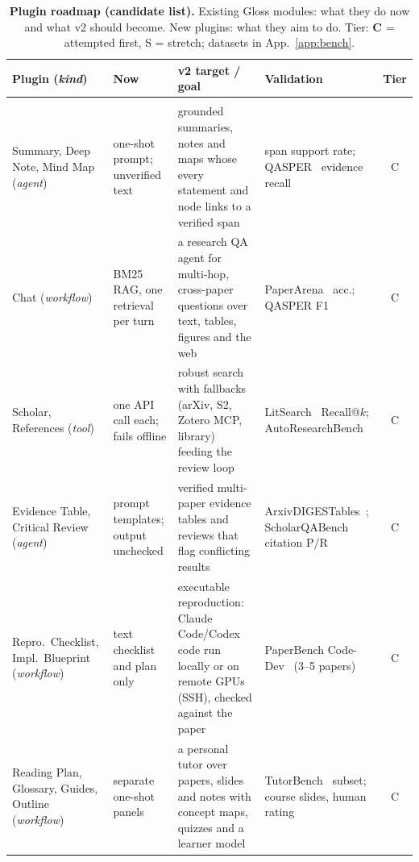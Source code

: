 \documentclass{article}
\newcommand{\rowrule}{\arrayrulecolor{glgray!45}\specialrule{0.25pt}{0.6pt}{0.9pt}\arrayrulecolor{black}}
\newcommand{\gloss}{Gloss}
\begin{document}
\begin{table}[!t]
  \caption{\textbf{Plugin roadmap (candidate list).} Existing \gloss{} modules: what they do now and what v2 should become. New plugins: what they aim to do. Tier: \textbf{C} = attempted first, S = stretch; datasets in App.~\ref{app:bench}.}
  \label{tab:plugins}
  \centering
  \scriptsize
  \setlength{\tabcolsep}{2.6pt}
  \renewcommand{\arraystretch}{1.05}
  \begin{tabularx}{\textwidth}{@{}>{\raggedright\arraybackslash}p{2.45cm}>{\raggedright\arraybackslash}p{1.95cm}>{\raggedright\arraybackslash}X>{\raggedright\arraybackslash}p{3.45cm}c@{}}
    \toprule
    \textbf{Plugin} (\textit{kind}) & \textbf{Now} & \textbf{v2 target / goal} & \textbf{Validation} & \textbf{Tier} \\
    \midrule
    \rowcolor{glpurple!7}\multicolumn{5}{@{}l}{\textit{Existing modules: what they do now $\to$ what v2 should become}} \\
    \rowrule
    Summary, Deep Note, Mind Map (\textit{agent}) & one-shot prompt; unverified text & grounded summaries, notes and maps whose every statement and node links to a verified span & span support rate; QASPER~\cite{dasigi2021qasper} evidence recall & C \\
    \rowrule
    Chat (\textit{workflow}) & BM25 RAG, one retrieval per turn & a research QA agent for multi-hop, cross-paper questions over text, tables, figures and the web & PaperArena~\cite{wang2025paperarena} acc.; QASPER F1 & C \\
    \rowrule
    Scholar, References (\textit{tool}) & one API call each; fails offline & robust search with fallbacks (arXiv, S2, Zotero MCP, library) feeding the review loop & LitSearch~\cite{ajith2024litsearch} Recall@$k$; AutoResearchBench~\cite{xiong2026autoresearchbench} & C \\
    \rowrule
    Evidence Table, Critical Review (\textit{agent}) & prompt templates; output unchecked & verified multi-paper evidence tables and reviews that flag conflicting results & ArxivDIGESTables~\cite{newman2024arxivdigestables}; ScholarQABench citation P/R & C \\
    \rowrule
    Repro.\ Checklist, Impl.\ Blueprint (\textit{workflow}) & text checklist and plan only & executable reproduction: Claude Code/Codex code run locally or on remote GPUs (SSH), checked against the paper & PaperBench Code-Dev~\cite{starace2025paperbench} (3--5 papers) & C \\
    \rowrule
    Reading Plan, Glossary, Guides, Outline (\textit{workflow}) & separate one-shot panels & a personal tutor over papers, slides and notes with concept maps, quizzes and a learner model & TutorBench~\cite{srinivasa2025tutorbench} subset; course slides, human rating & C \\

\end{tabularx}
\end{table}
\end{document}
